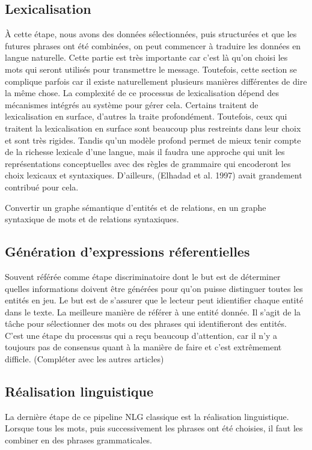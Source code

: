 \subsection{Lexicalisation}
À cette étape, nous avons des données sélectionnées, puis structurées et que les futures phrases ont été combinées, on peut commencer à traduire les données en langue naturelle. Cette partie est très importante car c'est là qu'on choisi les mots qui seront utilisés pour transmettre le message. Toutefois, cette section se complique parfois car il existe naturellement plusieurs manières différentes de dire la même chose. La complexité de ce processus de lexicalisation dépend des mécanismes intégrés au système pour gérer cela. Certains traitent de lexicalisation en surface, d'autres la traite profondément. Toutefois, ceux qui traitent la lexicalisation en surface sont beaucoup plus restreints dans leur choix et sont très rigides. Tandis qu'un modèle profond permet de mieux tenir compte de la richesse lexicale d'une langue, mais il faudra une approche qui unit les représentations conceptuelles avec des règles de grammaire qui encoderont les choix lexicaux et syntaxiques. D'ailleurs, (Elhadad et al. 1997) avait grandement contribué pour cela.

Convertir un graphe sémantique d'entités et de relations, en un graphe syntaxique de mots et de relations syntaxiques. 

\subsection{Génération d'expressions réferentielles}
Souvent référée comme étape discriminatoire dont le but est de déterminer quelles informations doivent être générées pour qu'on puisse distinguer toutes les entités en jeu. Le but est de s'assurer que le lecteur peut idientifier chaque entité dans le texte. La meilleure manière de référer à une entité donnée.
Il s'agit de la tâche pour sélectionner des mots ou des phrases qui identifieront des entités. C'est une étape du processus qui a reçu beaucoup d'attention, car il n'y a toujours pas de consensus quant à la manière de faire et c'est extrêmement difficle. (Compléter avec les autres articles)

\subsection{Réalisation linguistique}
La dernière étape de ce pipeline NLG classique est la réalisation linguistique. Lorsque tous les mots, puis successivement les phrases ont été choisies, il faut les combiner en des phrases grammaticales. 


